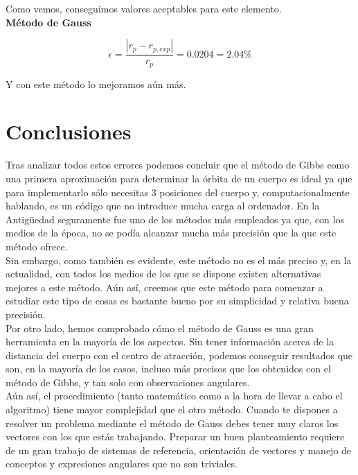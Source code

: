 \documentclass{article}
\numberwithin{equation}{section}
\begin{document}
Como vemos, conseguimos valores aceptables para este elemento.\\

\noindent\textbf{Método de Gauss}\par

\begin{equation*}
    \epsilon=\frac{\left\lvert r_p-r_{p,exp} \right\rvert }{r_p}=0.0204=2.04\%
\end{equation*}

Y con este método lo mejoramos aún más.

\section{Conclusiones}

Tras analizar todos estos errores podemos concluir que el 
método de Gibbs como una primera aproximación para determinar 
la órbita de un cuerpo es ideal ya que para implementarlo 
sólo necesitas 3 posiciones del cuerpo y, computacionalmente 
hablando, es un código que no introduce mucha carga al 
ordenador. En la Antigüedad seguramente 
fue uno de los métodos más empleados ya que, con los 
medios de la época, no se podía alcanzar mucha más 
precisión que la que este método ofrece.\\

Sin embargo, como también es evidente, este 
método no es el más preciso y, en la actualidad, con todos 
los medios de los que se dispone existen alternativas mejores 
a este método. Aún así, creemos que este método para 
comenzar a estudiar este tipo de cosas es bastante bueno 
por su simplicidad y relativa buena precisión.\\ 

Por otro lado, hemos comprobado cómo el método de Gauss es una gran herramienta en la mayoría de los aspectos. Sin tener información acerca de la distancia del cuerpo con el centro de atracción, podemos conseguir resultados que son, en la mayoría de los casos, incluso más precisos que los obtenidos con el método de Gibbs, y tan solo con observaciones angulares.\\

Aún así, el procedimiento (tanto matemático como a la hora de llevar a cabo el algoritmo) tiene mayor complejidad que el otro método. Cuando te dispones a resolver un problema mediante el método de Gauss debes tener muy claros los vectores con los que estás trabajando. Preparar un buen planteamiento requiere de un gran trabajo de sistemas de referencia, orientación de vectores y manejo de conceptos y expresiones angulares que no son triviales.\\
\end{document}
